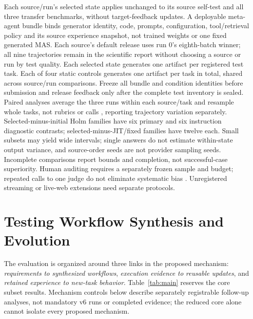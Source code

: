 \documentclass[11pt]{article}
\begin{document}
Each source/run's selected state applies unchanged to its source self-test and all three transfer benchmarks, without target-feedback updates. A deployable meta-agent bundle binds generator identity, code, prompts, configuration, tool/retrieval policy and its source experience snapshot, not trained weights or one fixed generated MAS. Each source's default release uses run 0's eighth-batch winner; all nine trajectories remain in the scientific report without choosing a source or run by test quality. Each selected state generates one artifact per registered test task. Each of four static controls generates one artifact per task in total, shared across source/run comparisons. Freeze all bundle and condition identities before submission and release feedback only after the complete test inventory is sealed. Paired analyses average the three runs within each source/task and resample whole tasks, not rubrics or calls \citep{dror2018significance}, reporting trajectory variation separately. Selected-minus-initial Holm families have six primary and six instruction diagnostic contrasts; selected-minus-JIT/fixed families have twelve each. Small subsets may yield wide intervals; single answers do not estimate within-state output variance, and source-order seeds are not provider sampling seeds. Incomplete comparisons report bounds and completion, not successful-case superiority. Human auditing requires a separately frozen sample and budget; repeated calls to one judge do not eliminate systematic bias \citep{zheng2023judge}. Unregistered streaming or live-web extensions need separate protocols.

\section{Testing Workflow Synthesis and Evolution}
\label{sec:results}

The evaluation is organized around three links in the proposed mechanism: \emph{requirements to synthesized workflows}, \emph{execution evidence to reusable updates}, and \emph{retained experience to new-task behavior}. Table~\ref{tab:main} reserves the core subset results. Mechanism controls below describe separately registrable follow-up analyses, not mandatory v6 runs or completed evidence; the reduced core alone cannot isolate every proposed mechanism.
\end{document}
